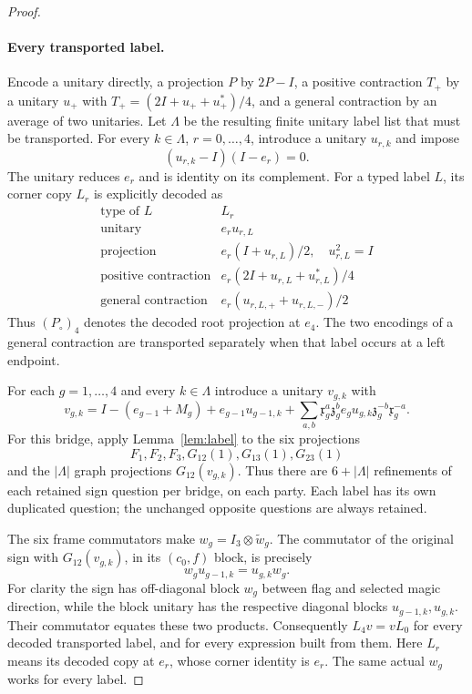 \begin{proof}
\paragraph{Every transported label.}
Encode a unitary directly, a projection $P$ by $2P-I$, a positive contraction $T_+$ by a unitary $u_+$ with $T_+=(2I+u_++u_+^*)/4$, and a general contraction by an average of two unitaries. Let $\Lambda$ be the resulting finite unitary label list that must be transported. For every $k\in\Lambda$, $r=0,\ldots,4$, introduce a unitary $u_{r,k}$ and impose
\begin{equation}\label{eq:supportcopies}
 (u_{r,k}-I)(I-e_r)=0.
\end{equation}
The unitary reduces $e_r$ and is identity on its complement. For a typed label $L$, its corner copy $L_r$ is explicitly decoded as
\[
 \begin{array}{c|c}
 \text{type of }L&L_r\\\hline
 \text{unitary}&e_ru_{r,L}\\
 \text{projection}&e_r(I+u_{r,L})/2,\quad u_{r,L}^2=I\\
 \text{positive contraction}&e_r(2I+u_{r,L}+u_{r,L}^*)/4\\
 \text{general contraction}&e_r(u_{r,L,+}+u_{r,L,-})/2
 \end{array}
\]
Thus $(P_{\circ})_4$ denotes the decoded root projection at $e_4$.
The two encodings of a general contraction are transported separately when
that label occurs at a left endpoint.

For each $g=1,\ldots,4$ and every $k\in\Lambda$ introduce a unitary $v_{g,k}$ with
\begin{equation}\label{eq:blockcopies}
 v_{g,k}=I-(e_{g-1}+M_g)+e_{g-1}u_{g-1,k}
 +\sum_{a,b}\mathfrak x_g^a\mathfrak z_g^b e_gu_{g,k}\mathfrak z_g^{-b}\mathfrak x_g^{-a}.
\end{equation}
For this bridge, apply Lemma~\ref{lem:label} to the six projections
\[
 F_1,F_2,F_3,G_{12}(1),G_{13}(1),G_{23}(1)
\]
and the $|\Lambda|$ graph projections $G_{12}(v_{g,k})$. Thus there are $6+|\Lambda|$ refinements of each retained sign question per bridge, on each party. Each label has its own duplicated question; the unchanged opposite questions are always retained.

The six frame commutators make $w_g=I_3\otimes\widetilde w_g$. The commutator of the original sign with $G_{12}(v_{g,k})$, in its $(c_0,f)$ block, is precisely
\begin{equation}\label{eq:transportcopies}
 w_gu_{g-1,k}=u_{g,k}w_g.
\end{equation}
For clarity the sign has off-diagonal block $w_g$ between flag and selected magic direction, while the block unitary has the respective diagonal blocks $u_{g-1,k},u_{g,k}$. Their commutator equates these two products. Consequently $L_4v=vL_0$ for every decoded transported label, and for every expression built from them. Here $L_r$ means its decoded copy at $e_r$, whose corner identity is $e_r$. The same actual $w_g$ works for every label.


\end{proof}
